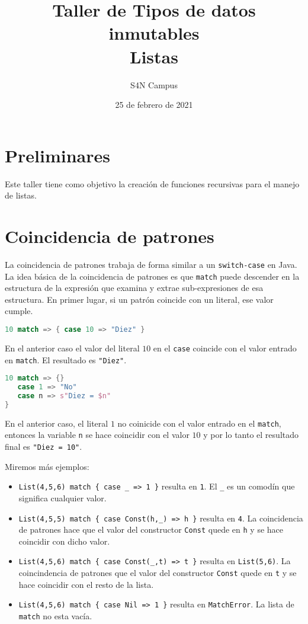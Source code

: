 \documentclass[12pt]{article}
\title{Taller de Tipos de datos inmutables\\Listas}
\date{25 de febrero de 2021}
\author{S4N Campus}
\begin{document}
\maketitle

\section{Preliminares}
\label{sec:preliminares}

Este taller tiene como objetivo la creación de funciones recursivas para el manejo de listas.

\section{Coincidencia de patrones}
\label{sec:listas}

La coincidencia de patrones trabaja de forma similar a un
\texttt{switch-case} en Java. La idea básica de la coincidencia de
patrones es que \texttt{match} puede descender en la estructura de la
expresión que examina y extrae sub-expresiones de esa estructura. En primer lugar, si un patrón coincide con un literal, ese valor cumple.

\begin{lstlisting}[language=Scala]
10 match => { case 10 => "Diez" }
\end{lstlisting}

En el anterior caso el valor del literal $10$ en el \texttt{case} coincide con el valor entrado en \texttt{match}. El resultado es \texttt{"Diez"}.

\begin{lstlisting}[language=Scala]
10 match => {}
   case 1 => "No"
   case n => s"Diez = $n"
}
\end{lstlisting}

En el anterior caso, el literal
$1$ no coinicide con el valor entrado en el \texttt{match}, entonces
la variable \texttt{n} se hace coincidir con el valor
$10$ y por lo tanto el resultado final es \texttt{"Diez = 10"}.

Miremos más ejemplos:

\begin{itemize}
\item \texttt{List(4,5,6) match \{ case \_ => 1 \}} resulta en
  \texttt{1}. El \texttt{\_} es un comodín que significa cualquier
  valor.
\item \texttt{List(4,5,5) match \{ case Const(h,\_) => h \}} resulta en \texttt{4}. La coincidencia de patrones hace que el valor del constructor \texttt{Const}
  quede en \texttt{h} y se hace coincidir con dicho valor.
\item \texttt{List(4,5,6) match \{ case Const(\_,t) => t \}} resulta en \texttt{List(5,6)}. La coincindencia de patrones que el valor del constructor \texttt{Const}
  quede en \texttt{t} y se hace coincidir con el resto de la lista.
\item \texttt{List(4,5,6) match \{ case Nil => 1 \}} resulta en \texttt{MatchError}. La lista de \texttt{match} no esta vacía.
\end{itemize}
\end{document}
